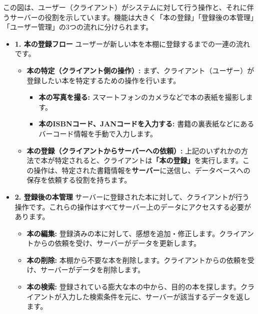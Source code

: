 \documentclass[a4paper, 11pt, titlepage]{jsarticle}
\begin{document}
この図は、ユーザー（クライアント）がシステムに対して行う操作と、それに伴うサーバーの役割を示しています。機能は大きく「本の登録」「登録後の本管理」「ユーザー管理」の3つの流れに分けられます。
\begin{itemize}
	 \item \textbf{1. 本の登録フロー} 
	ユーザーが新しい本を本棚に登録するまでの一連の流れです。

	\begin{itemize}
    		\item \textbf{本の特定（クライアント側の操作）:}
    	まず、クライアント（ユーザー）が登録したい本を特定するための操作を行います。
    		\begin{itemize}
        			\item \textbf{本の写真を撮る:} スマートフォンのカメラなどで本の表紙を撮影します。
        			\item \textbf{本のISBNコード、JANコードを入力する:} 書籍の裏表紙などにあるバーコード情報を手動で入力します。
    		\end{itemize}
    	\item \textbf{本の登録（クライアントからサーバーへの依頼）:}
    上記のいずれかの方法で本が特定されると、クライアントは\textbf{「本の登録」}を実行します。この操作は、特定された書籍情報を\textbf{サーバー}に送信し、データベースへの保存を依頼する役割を持ちます。
	\end{itemize}
	\item \textbf{2. 登録後の本管理} 
	サーバーに登録された本に対して、クライアントが行う操作です。これらの操作はすべてサーバー上のデータにアクセスする必要があります。

	\begin{itemize}
    		\item \textbf{本の編集:} 登録済みの本に対して、感想を追加・修正します。クライアントからの依頼を受け、サーバーがデータを更新します。
    		\item \textbf{本の削除:} 本棚から不要な本を削除します。クライアントからの依頼を受け、サーバーがデータを削除します。
    		\item \textbf{本の検索:} 登録されている膨大な本の中から、目的の本を探します。クライアントが入力した検索条件を元に、サーバーが該当するデータを返します。
	\end{itemize}
\end{itemize}
\clearpage
\end{document}

